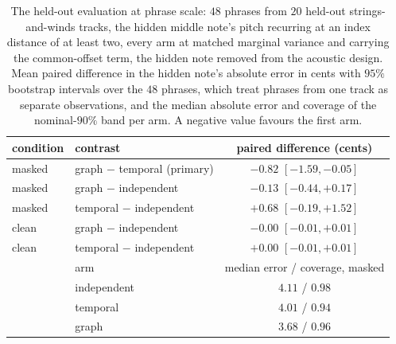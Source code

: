 \documentclass[11pt,a4paper]{report}
\begin{document}
\begin{table}[t]\centering
\caption{The held-out evaluation at phrase scale: $48$ phrases from $20$
held-out strings-and-winds tracks, the hidden middle note's pitch
recurring at an index distance of at least two, every arm at matched
marginal variance and carrying the common-offset term, the hidden note
removed from the acoustic design. Mean paired difference in the hidden
note's absolute error in cents with $95\%$ bootstrap intervals over the
$48$ phrases, which treat phrases from one track as separate
observations, and the median absolute
error and coverage of the nominal-$90\%$ band per arm. A negative value
favours the first arm.}
\label{tab:phase3-heldout}
\footnotesize
\begin{tabular}{@{}llc@{}}
\toprule
condition & contrast & paired difference (cents) \\
\midrule
masked & graph $-$ temporal (primary) & $-0.82$ $[-1.59, -0.05]$ \\
masked & graph $-$ independent & $-0.13$ $[-0.44, +0.17]$ \\
masked & temporal $-$ independent & $+0.68$ $[-0.19, +1.52]$ \\
clean & graph $-$ independent & $-0.00$ $[-0.01, +0.01]$ \\
clean & temporal $-$ independent & $+0.00$ $[-0.01, +0.01]$ \\
\midrule
& arm & median error / coverage, masked \\
\midrule
& independent & $4.11$ / $0.98$ \\
& temporal & $4.01$ / $0.94$ \\
& graph & $3.68$ / $0.96$ \\
\bottomrule
\end{tabular}
\end{table}
\end{document}
